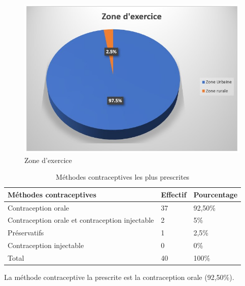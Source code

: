 \begin{figure}[H]
  \centering
  \includegraphics{Images/fig_47.jpg}
  \caption{Zone d’exercice}  
\end{figure}

\begin{table}[H]
  \centering
  \renewcommand{\arraystretch}{1.5}
  \caption{Méthodes contraceptives les plus prescrites}
  \begin{spacing}{1.5} %
  \begin{tabularx}{\textwidth}{|p{8cm}|X|X|}
      \hline
      \rowcolor{customcolor!90}
      \textbf{\color{white}Méthodes contraceptives} & \textbf{\color{white}Effectif} & \textbf{\color{white}Pourcentage}  \\
      \hline
      Contraception orale & 37 & 92,50\% \\
      \hline
      Contraception orale et contraception \newline injectable & 2 & 5\% \\
      \hline
      Préservatifs  & 1 & 2,5\% \\
      \hline
      Contraception injectable & 0 & 0\% \\
     \hline
      Total & 40 & 100\% \\
      \hline
  \end{tabularx}
\end{spacing}

\end{table}

\noindent La méthode contraceptive la prescrite est la contraception orale (92,50\%).

